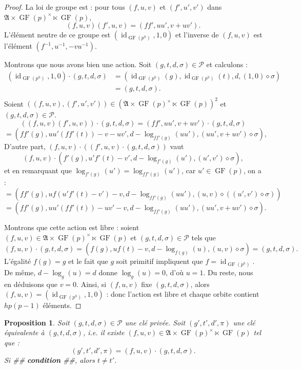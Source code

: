 \documentclass[a4paper, titlepage]{article}
\newtheorem{prop}[theo]{Proposition}
\theoremstyle{definition}
\theoremstyle{remark}
\def\gf{\operatorname{GF}}
\def\id{\operatorname{id}}
\begin{document}
\begin{proof}
La loi de groupe est : pour tous $(f,u,v)$ et $(f',u',v')$ dans $\mathfrak{A} \times \gf(p)^\times \ltimes \gf(p)$,
$$(f,u,v)(f',u,v) = (ff',uu', v+uv').$$
L'élément neutre de ce groupe est $(\id_{\gf(p^h)}, 1, 0)$ et l'inverse de $(f,u,v)$ est l'élément $(f^{-1}, u^{-1}, -vu^{-1})$.

Montrons que nous avons bien une action. Soit $(g,t,d,\sigma) \in \mathcal{P}$ et calculons : 
\begin{align*}
(\id_{\gf(p^h)}, 1, 0) \cdot (g,t,d,\sigma) &= \left(\id_{\gf(p^h)}(g), \id_{\gf(p^h)}(t),d,(1,0)\diamond\sigma \right)\\
&= \left(g, t,d, \sigma \right).\\
\end{align*}
Soient $((f,u,v),(f',u',v')) \in ({\mathfrak{A} \times \gf(p)^\times \ltimes \gf(p)})^2$  et $(g,t,d,\sigma) \in \mathcal{P}$.
$$((f,u,v)(f',u,v)) \cdot (g,t,d,\sigma) = (ff', uu', v+uv') \cdot (g,t,d,\sigma)$$
$$= \left(ff'(g), uu'(ff'(t)) - v-uv',d - \log_{ff'(g)}(uu'),(uu', v+uv')\diamond\sigma \right),$$
D'autre part, $(f,u,v)\cdot\left((f',u,v) \cdot (g,t,d,\sigma)\right)$ vaut
$$(f,u,v)\cdot (f'(g),u'f'(t)-v',d - \log_{f'(g)}(u'),(u',v')\diamond\sigma),$$
et en remarquant que $\log_{f'(g)}(u') = \log_{ff'(g)}(u')$, car $u' \in \gf(p)$, on a :
$$= \left(ff'(g), uf(u'f'(t) - v') -v,d - \log_{ff'(g)}(uu'),(u, v)\diamond((u',v')\diamond\sigma) \right)$$
$$= \left(ff'(g), uu'(ff'(t)) - uv' -v,d - \log_{ff'(g)}(uu'),(uu',v + uv')\diamond\sigma \right).$$

Montrons que cette action est libre : soient $(f,u,v)  \in \mathfrak{A} \times \gf(p)^\times \ltimes \gf(p)$ et $(g,t,d,\sigma) \in \mathcal{P}$ tels que
$$(f,u, v) \cdot (g,t,d,\sigma) =\left(f(g), uf(t)-v,d-\log_{f(g)}(u),(u,v)\diamond\sigma \right) =(g,t,d,\sigma).$$
L'égalité $f(g) = g$ et le fait que $g$ soit primitif impliquent que $f = \id_{\gf(p^h)}$. De même, $d-\log_{g}(u) = d$ donne $\log_{g}(u) = 0$, d'où $u=1$. Du reste, nous en déduisons que $v=0$. Ainsi, si $(f,u,v)$ fixe $(g,t,d,\sigma)$, alors $(f,u,v) = (\id_{\gf(p^h)},1,0)$ : donc l'action est libre et chaque orbite contient $hp(p-1)$ éléments.
\end{proof}

\begin{prop}
Soit $(g,t,d,\sigma) \in \mathcal{P}$ une clé privée. Soit $(g',t',d',\pi)$ une clé équivalente à $(g,t,d,\sigma)$, i.e. il existe $(f,u,v) \in {\mathfrak{A} \times \gf(p)^\times \ltimes \gf(p)}$ tel que : 
$$(g',t',d',\pi) = (f,u,v)\cdot(g,t,d,\sigma).$$
Si \#\# \textbf{condition} \#\#, alors $t\neq t'$.
\end{prop}
\end{document}
